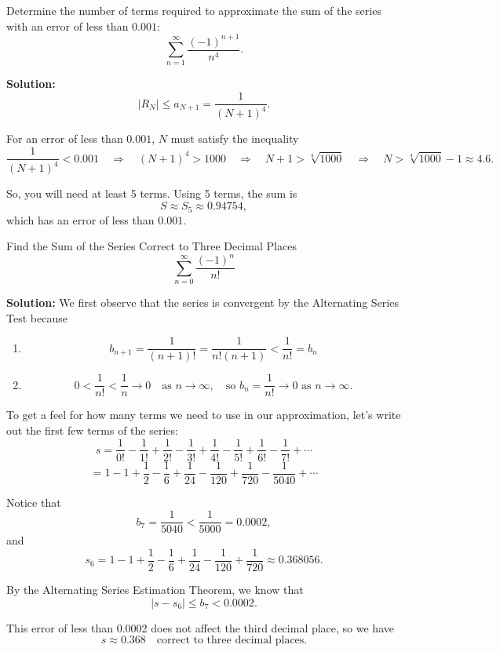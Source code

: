 \documentclass[12pt]{article}
\theoremstyle{beautifulthm}
\begin{document}
\begin{tcolorbox}[colback=examplebg, colframe=red!75!black, title=\textbf{EXAMPLE 1: Finding the Number of Terms}, fonttitle=\bfseries, sharp corners]

Determine the number of terms required to approximate the sum of the series with an error of less than $0.001$:
\[
\sum_{n=1}^\infty \frac{(-1)^{n+1}}{n^4}.
\]

\tcblower
\textbf{Solution:} 
\[
|R_N| \leq a_{N+1} = \frac{1}{(N+1)^4}.
\]

For an error of less than $0.001$, $N$ must satisfy the inequality
\[
\frac{1}{(N+1)^4} < 0.001 \quad \Rightarrow \quad (N+1)^4 > 1000 \quad \Rightarrow \quad N+1 > \sqrt[4]{1000} \quad \Rightarrow \quad N > \sqrt[4]{1000} - 1 \approx 4.6.
\]

So, you will need at least 5 terms. Using 5 terms, the sum is
\[
S \approx S_5 \approx 0.94754,
\]
which has an error of less than $0.001$.
\end{tcolorbox}

\begin{tcolorbox}[colback=examplebg, colframe=red!75!black, title=\textbf{EXAMPLE 2: Find the Sum of the Series}, fonttitle=\bfseries, sharp corners]

Find the Sum of the Series Correct to Three Decimal Places
\[
\sum_{n=0}^\infty \frac{(-1)^n}{n!}
\]

\tcblower
\textbf{Solution:} 
We first observe that the series is convergent by the Alternating Series Test because
\begin{enumerate}
    \item[(i)] \[
    b_{n+1} = \frac{1}{(n+1)!} = \frac{1}{n!(n+1)} < \frac{1}{n!} = b_n
    \]
    \item[(ii)] \[
    0 < \frac{1}{n!} < \frac{1}{n} \to 0 \quad \text{as } n \to \infty, \quad \text{so } b_n = \frac{1}{n!} \to 0 \text{ as } n \to \infty.
    \]
\end{enumerate}

To get a feel for how many terms we need to use in our approximation, let’s write out the first few terms of the series:
\[
s = \frac{1}{0!} - \frac{1}{1!} + \frac{1}{2!} - \frac{1}{3!} + \frac{1}{4!} - \frac{1}{5!} + \frac{1}{6!} - \frac{1}{7!} + \cdots
\]
\[
= 1 - 1 + \frac{1}{2} - \frac{1}{6} + \frac{1}{24} - \frac{1}{120} + \frac{1}{720} - \frac{1}{5040} + \cdots
\]

Notice that
\[
b_7 = \frac{1}{5040} < \frac{1}{5000} = 0.0002,
\]
and
\[
s_6 = 1 - 1 + \frac{1}{2} - \frac{1}{6} + \frac{1}{24} - \frac{1}{120} + \frac{1}{720} \approx 0.368056.
\]

By the Alternating Series Estimation Theorem, we know that
\[
|s - s_6| \leq b_7 < 0.0002.
\]

This error of less than 0.0002 does not affect the third decimal place, so we have
\[
s \approx 0.368 \quad \text{correct to three decimal places.}
\]
\end{tcolorbox}
\end{document}
